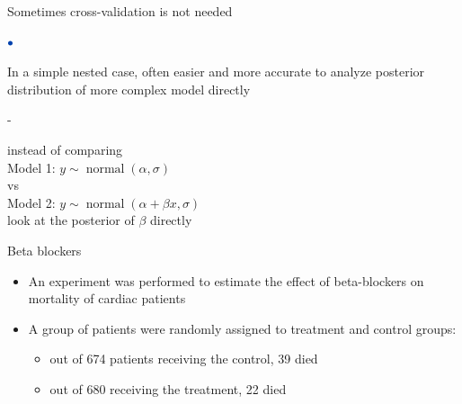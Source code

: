 \documentclass[english,t]{beamer}
\DeclareMathOperator{\normal}{normal}
\newenvironment{list1}{
   \begin{list}{$\color{list1}\bullet$}{\itemsep=6pt}}{
  \end{list}}
\newenvironment{list2}{
  \begin{list}{-}{\baselineskip=12pt\itemsep=2pt}}{
  \end{list}}
\begin{document}
\begin{frame}{Sometimes cross-validation is not needed}

\begin{list1}
\item<+-> In a simple nested case, often easier and more accurate to
  analyze posterior distribution of more complex model directly
  \begin{list2}
  \item instead of comparing\\
    \vspace{0.2\baselineskip}
    Model 1: $y \sim \normal(\alpha, \sigma)$\\
    \vspace{0.2\baselineskip}
    vs\\
    \vspace{0.2\baselineskip}
    Model 2: $y \sim \normal(\alpha + \beta x, \sigma)$\\
    \vspace{0.2\baselineskip}
    look at the posterior of $\beta$ directly
  \end{list2}
\end{list1}

\end{frame}

\begin{frame}[fragile]{Beta blockers}

\begin{itemize}
  \item An experiment was performed to estimate the effect of
    beta-blockers on mortality of cardiac patients
  \item A group of
    patients were randomly assigned to treatment and control groups:
    \begin{itemize}
    \item out of 674 patients receiving the control, 39 died
    \item out of 680 receiving the treatment, 22 died
    \end{itemize}
  \end{itemize}

\end{frame}
\end{document}
